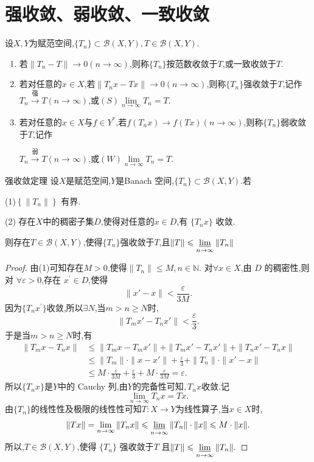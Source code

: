 \documentclass[lang=cn,18pt]{elegantbook}
\begin{document}
\section{强收敛、弱收敛、一致收敛}
\begin{definition}
    设$X,Y$为赋范空间,$\{T_n\} \subset \mathscr{B}(X,Y),T \in \mathscr{B}(X,Y)$.
    \begin{enumerate}
        \item 若$\|T_n -T\| \to 0  (n \to \infty)$,则称$\{T_n\}$按范数收敛于$T$,或一致收敛于$T$.
        \item 若对任意的$x \in X$,若$\|T_n x -Tx\| \to 0  (n \to \infty)$,则称$\{T_n\}$强收敛于$T$,记作$T_n\xrightarrow{\text{强}}T(n\to\infty)$,或$(S)\lim\limits_{n\to \infty}T_n=T$.
        \item 若对任意的$x \in X$与$f \in Y^*$,若$f(T_n x)\to f(Tx)(n\to \infty)$,则称$\{T_n\}$弱收敛于$T$,记作
        
        $T_n\xrightarrow{\text{弱}}T(n\to\infty)$,或$(W)\lim\limits_{n \to \infty}T_n =T$.
    \end{enumerate}
\end{definition}



\begin{theorem}{强收敛定理}
    设$X$是赋范空间,$Y$是Banach 空间,$\{T_n\}\subset\mathscr{B}(X,Y).$若

(1)$\left\{\|T_n\|\right\}$ 有界.

(2) 存在$X$中的稠密子集$D$,使得对任意的$x\in D$,有
$\{T_{n}x\}$ 收敛.

则存在$T\in\mathscr{B}(X,Y)$,使得$\{T_n\}$强收敛于$T$,且$\|T\|\leqslant  \varliminf\limits_{n\to\infty}\|T_n\|$
\end{theorem}
\begin{proof}
   由(1)可知存在$M>0$,使得$\|T_n\|\leqslant M,n\in\mathbb{N}.$
对$\forall x\in X$,由 $D$ 的稠密性,则对 $\forall\varepsilon>0$,存在 $x^\prime\in D$,使得
$$\|x'-x\|<\frac{\varepsilon}{3M}.$$
因为$\{T_{n}x^{\prime}\}$收敛,所以$\exists N$,当$m>n\geqslant N$时,
$$\|T_mx'-T_nx'\|<\frac{\varepsilon}{3}.$$
于是当$m>n\geqslant N$时,有
\begin{align*}
    \|T_{m}x-T_{n}x\|& \leqslant\|T_{m}x-T_{m}x'\|+\|T_{m}x'-T_{n}x'\|+\|T_{n}x'-T_{n}x\| \\
    & \leqslant\|T_m\|\cdot\|x-x'\|+\frac{\varepsilon}{3}+\|T_n\|\cdot\|x'-x\| \\
    & \leqslant M\cdot\frac{\varepsilon}{3M}+\frac{\varepsilon}{3}+M\cdot\frac{\varepsilon}{3M}=\varepsilon.
\end{align*}
所以$\{T_nx\}$是$Y$中的 Cauchy 列,由$Y$的完备性可知$,T_nx$收敛.记
$$\lim_{n\to\infty}T_nx=Tx.$$
由$\{T_n\}$的线性性及极限的线性性可知$T:X\to Y$为线性算子,当$x\in X$时,
$$\|Tx\|=\lim\limits_{n\to\infty}\|T_nx\|\leqslant\varliminf\limits_{n\to\infty}\|T_n\|\cdot\|x\|\leqslant M\cdot\|x\|.$$
所以,$T\in\mathscr{B}(X,Y)$,使得 $\{T_n\}$ 强收敛于$T$ 且$\|T\|\leqslant\varliminf\limits_{n\to\infty}\|T_n\|.$
\end{proof}
\end{document}
